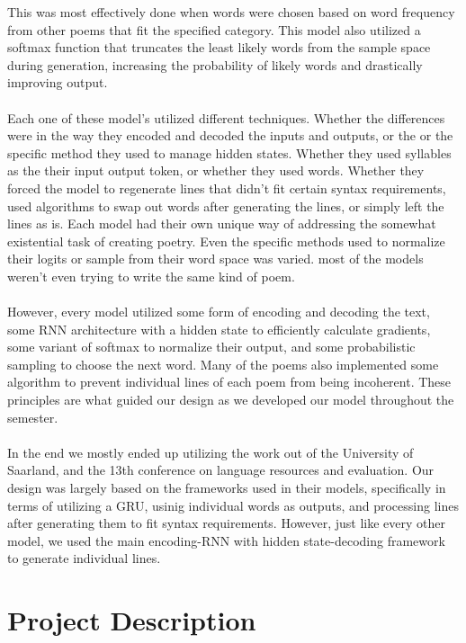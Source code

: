 \documentclass{article} %
\begin{document}
This was most effectively done when words were chosen based on word frequency from other poems that fit the specified category. 
This model also utilized a softmax function that truncates the least likely words from the sample space during generation, increasing the probability of likely words and drastically improving output.\\\\
Each one of these model's utilized different techniques. Whether the differences were in the way they encoded and decoded the inputs and outputs, or the or the specific method they used to manage hidden states. Whether they used syllables as the their input output token, or whether they used words. Whether they forced the model to regenerate lines that didn't fit certain syntax requirements, used algorithms to swap out words after generating the lines, or simply left the lines as is. Each model had their own unique way of addressing the somewhat existential task of creating poetry. Even the specific methods used to normalize their logits or sample from their word space was varied. most of the models weren't even trying to write the same kind of poem.\\\\ 
However, every model utilized some form of encoding and decoding the text, some RNN architecture with a hidden state to efficiently calculate gradients, some variant of softmax to normalize their output, and some probabilistic sampling to choose the next word. Many of the poems also implemented some algorithm to prevent individual lines of each poem from being incoherent. These principles are what guided our design as we developed our model throughout the semester.\\\\
In the end we mostly ended up utilizing the work out of the University of Saarland, and the 13th conference on language resources and evaluation. Our design was largely based on the frameworks used in their models, specifically in terms of utilizing a GRU, usinig individual words as outputs, and processing lines after generating them to fit syntax requirements. However, just like every other model, we used the main encoding-RNN with hidden state-decoding framework to generate individual lines.

\section{Project Description}
\end{document}
